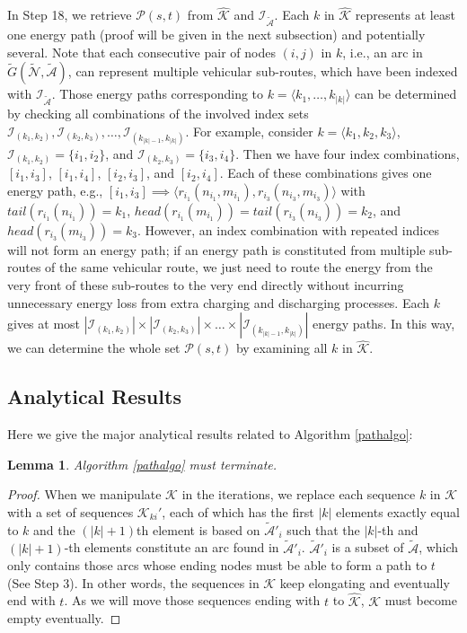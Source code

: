 \documentclass[journal]{IEEEtran}
\newtheorem{lemma}{\textbf{Lemma}}
\begin{document}
In Step 18, we retrieve $\mathcal{P}(s,t)$ from $\hat{\mathcal{K}}$ and $\mathcal{I}_{\tilde{\mathcal{A}}}$. Each $k$ in $\hat{\mathcal{K}}$ represents at least one energy path (proof will be given in the next subsection) and potentially several. Note that each consecutive pair of nodes  $(i,j) $ in $k$, i.e., an arc in $\tilde{G}(\tilde{\mathcal{N}},\tilde{\mathcal{A}})$, can represent multiple vehicular sub-routes, which have been indexed with $\mathcal{I}_{\tilde{\mathcal{A}}}$. Those energy paths corresponding to $k=\langle k_1,\ldots, k_{|k|} \rangle$ can be determined by checking all combinations of the involved index sets $\mathcal{I}_{(k_1,k_2)}, \mathcal{I}_{(k_2,k_3)}, \ldots,\mathcal{I}_{(k_{|k|-1},k_{|k|})}$. For example, consider $k=\langle k_1,k_2,k_3\rangle$, $\mathcal{I}_{(k_1,k_2)}=\{i_1,i_2\}$, and $\mathcal{I}_{(k_2,k_3)}=\{i_3,i_4\}$. Then we have four index combinations, $[i_1,i_3]$, $[i_1,i_4]$,  $[i_2,i_3]$, and $[i_2,i_4]$. Each of these combinations gives one energy path, e.g., $[i_1,i_3]\implies \langle r_{i_1}(n_{i_1},m_{i_1}),r_{i_3}(n_{i_3},m_{i_3}) \rangle$ with $tail(r_{i_1}(n_{i_1}))=k_1$, $head(r_{i_1}(m_{i_1}))= tail(r_{i_3}(n_{i_3})) =k_2$, and $head(r_{i_3}(m_{i_3})) =k_3$. 
However, an index combination with repeated indices will not form an energy path; if an energy path is constituted from multiple sub-routes of the same vehicular route, we just need to route the energy from the very front of these sub-routes to the very end directly without incurring unnecessary energy loss from extra charging and discharging processes.
Each $k$ gives at most $|\mathcal{I}_{(k_1,k_2)}| \times |\mathcal{I}_{(k_2,k_3)}| \times \ldots \times |\mathcal{I}_{(k_{|k|-1},k_{|k|})}|$ energy paths. 
In this way, we can determine the whole set $\mathcal{P}(s,t)$ by examining all $k$ in $\hat{\mathcal{K}}$.


\subsection{Analytical Results} \label{sec:analysis}
Here we give the major analytical results related to Algorithm \ref{pathalgo}:
\begin{lemma} \label{lm:stop}
Algorithm \ref{pathalgo} must terminate.
\end{lemma}
\begin{proof}
When we manipulate $\mathcal{K}$ in the iterations, we replace each sequence $k$ in $\mathcal{K}$ with a set of sequences $\mathcal{K}_{ki}'$, each of which has the first $|k|$ elements exactly equal to $k$ and the $(|k|+1)$th element is based on $\tilde{\mathcal{A}}'_i$ such that the $|k|$-th and $(|k|+1)$-th elements constitute an arc found in $\tilde{\mathcal{A}}'_i$. $\tilde{\mathcal{A}}'_i$ is a subset of $\tilde{\mathcal{A}}$, which only contains those arcs whose ending nodes must be able to form a path to $t$ (See Step 3). In other words, the sequences in $\mathcal{K}$ keep elongating and eventually end with $t$. As we will move those sequences ending with $t$ to $\hat{\mathcal{K}}$, $\mathcal{K}$ must become empty eventually.
\end{proof}
\end{document}
